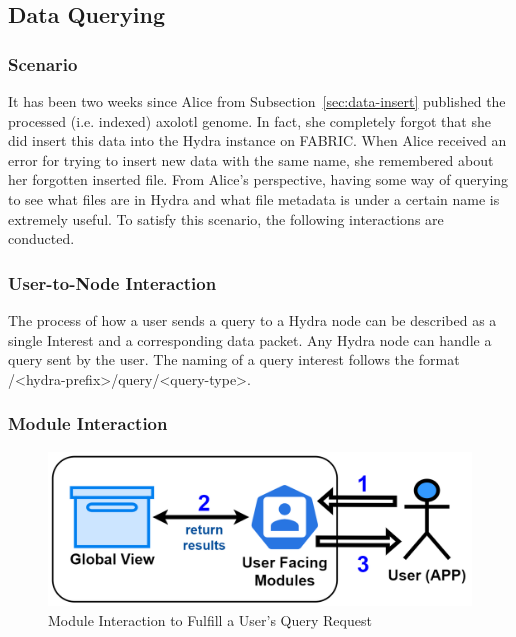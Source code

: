 \subsection{Data Querying} \label{sec:data-query}


\subsubsection{Scenario}
It has been two weeks since Alice from Subsection~\ref{sec:data-insert} published the processed (i.e. indexed) axolotl genome. In fact, she completely forgot that she did insert this data into the Hydra instance on FABRIC. When Alice received an error for trying to insert new data with the same name, she remembered about her forgotten inserted file. From Alice's perspective, having some way of querying to see what files are in Hydra and what file metadata is under a certain name is extremely useful. To satisfy this scenario, the following interactions are conducted.


\subsubsection{User-to-Node Interaction}
The process of how a user sends a query to a Hydra node can be described as a single Interest and a corresponding data packet. Any Hydra node can handle a query sent by the user. The naming of a query interest follows the format /<hydra-prefix>/query/<query-type>.


\subsubsection{Module Interaction}
\begin{figure}[!ht]
    \centering
    \includegraphics[width=\columnwidth]{visuals/query-sys.png}
    \caption{Module Interaction to Fulfill a User's Query Request}
    \label{fig:query-sys}
\end{figure}

